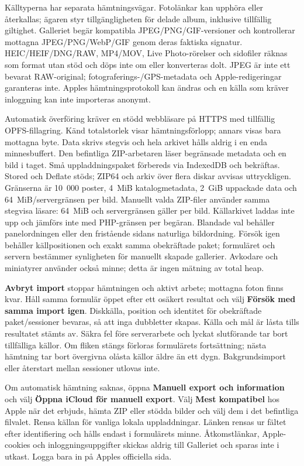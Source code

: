 \documentclass[11pt,a4paper]{article}
\newcommand{\ui}[1]{\textbf{#1}}
\begin{document}
Källtyperna har separata hämtningsvägar. Fotolänkar kan upphöra eller
återkallas; ägaren styr tillgängligheten för delade album, inklusive tillfällig
giltighet. Galleriet begär kompatibla JPEG/PNG/GIF-versioner och kontrollerar
mottagna JPEG/PNG/WebP/GIF genom deras faktiska signatur. HEIC/HEIF/DNG/RAW,
MP4/MOV, Live Photo-rörelser och sidofiler räknas som format utan stöd och döps
inte om eller konverteras dolt. JPEG är inte ett bevarat RAW-original;
fotograferings-/GPS-metadata och Apple-redigeringar garanteras inte. Apples
hämtningsprotokoll kan ändras och en källa som kräver inloggning kan inte
importeras anonymt.

Automatisk överföring kräver en stödd webbläsare på HTTPS med tillfällig
OPFS-fillagring. Känd totalstorlek visar hämtningsförlopp; annars visas bara
mottagna byte. Data skrivs stegvis och hela arkivet hålls aldrig i en enda
minnesbuffert. Den befintliga ZIP-arbetaren läser begränsade metadata och en
bild i taget. Små uppladdningspaket förbereds via IndexedDB och bekräftas.
Stored och Deflate stöds; ZIP64 och arkiv över flera diskar avvisas
uttryckligen. Gränserna är 10~000 poster, 4~MiB katalogmetadata, 2~GiB
uppackade data och 64~MiB/servergränsen per bild. Manuellt valda ZIP-filer
använder samma stegvisa läsare: 64~MiB och servergränsen gäller per bild.
Källarkivet laddas inte upp och jämförs inte med PHP-gränsen per begäran.
Blandade val behåller panelordningen eller den fristående sidans naturliga
bildordning. Försök igen behåller källpositionen och exakt samma obekräftade
paket; formuläret och servern bestämmer synligheten för manuellt skapade
gallerier. Avkodare och miniatyrer använder också minne; detta är ingen mätning
av total heap.

\ui{Avbryt import} stoppar hämtningen och aktivt arbete; mottagna foton finns
kvar. Håll samma formulär öppet efter ett osäkert resultat och välj \ui{Försök
med samma import igen}. Diskkälla, position och identitet för obekräftade
paket/sessioner bevaras, så att inga dubbletter skapas. Källa och mål är låsta
tills resultatet stämts av. Säkra fel före serverarbete och lyckat slutförande
tar bort tillfälliga källor. Om fliken stängs förloras formulärets fortsättning;
nästa hämtning tar bort övergivna olåsta källor äldre än ett dygn.
Bakgrundsimport eller återstart mellan sessioner utlovas inte.

Om automatisk hämtning saknas, öppna \ui{Manuell export och information} och
välj \ui{Öppna iCloud för manuell export}. Välj \ui{Mest kompatibel} hos Apple
när det erbjuds, hämta ZIP eller stödda bilder och välj dem i det befintliga
filvalet. Rensa källan för vanliga lokala uppladdningar. Länken rensas ur fältet
efter identifiering och hålls endast i formulärets minne. Åtkomstlänkar,
Apple-cookies och inloggningsuppgifter skickas aldrig till Galleriet och sparas
inte i utkast. Logga bara in på Apples officiella sida.
\end{document}
